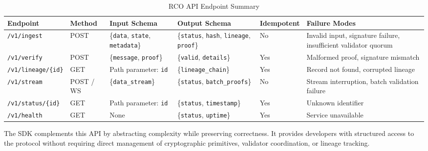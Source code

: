 \begin{table}[htbp]
\footnotesize
\centering
\caption{RCO API Endpoint Summary}
\label{tab:api-endpoints}

\renewcommand{\arraystretch}{1.25}

\begin{tabularx}{\textwidth}{|p{3cm}|p{1.8cm}|X|X|p{1.8cm}|X|}
\hline
\textbf{Endpoint} & \textbf{Method} & \textbf{Input Schema} & \textbf{Output Schema} & \textbf{Idempotent} & \textbf{Failure Modes} \\
\hline

\texttt{/v1/ingest} & POST & 
\{\texttt{data}, \texttt{state}, \texttt{metadata}\} &
\{\texttt{status}, \texttt{hash}, \texttt{lineage}, \texttt{proof}\} &
No &
Invalid input, signature failure, insufficient validator quorum \\

\hline

\texttt{/v1/verify} & POST &
\{\texttt{message}, \texttt{proof}\} &
\{\texttt{valid}, \texttt{details}\} &
Yes &
Malformed proof, signature mismatch \\

\hline

\texttt{/v1/lineage/\{id\}} & GET &
Path parameter: \texttt{id} &
\{\texttt{lineage\_chain}\} &
Yes &
Record not found, corrupted lineage \\

\hline

\texttt{/v1/stream} & POST / WS &
\{\texttt{data\_stream}\} &
\{\texttt{status}, \texttt{batch\_proofs}\} &
No &
Stream interruption, batch validation failure \\

\hline

\texttt{/v1/status/\{id\}} & GET &
Path parameter: \texttt{id} &
\{\texttt{status}, \texttt{timestamp}\} &
Yes &
Unknown identifier \\

\hline

\texttt{/v1/health} & GET &
None &
\{\texttt{status}, \texttt{uptime}\} &
Yes &
Service unavailable \\

\hline

\end{tabularx}
\end{table}

The SDK complements this API by abstracting complexity while preserving correctness. It provides developers with structured access to the protocol without requiring direct management of cryptographic primitives, validator coordination, or lineage tracking.

